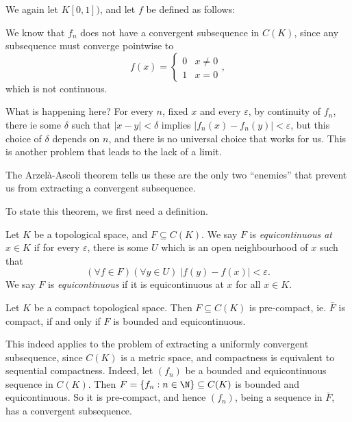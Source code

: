 \documentclass[a4paper]{article}
\begin{document}
\begin{eg}
  We again let $K[0, 1])$, and let $f$ be defined as follows:
  \begin{center}
  \end{center}
  We know that $f_n$ does not have a convergent subsequence in $C(K)$, since any subsequence must converge pointwise to
  \[
    f(x) =
    \begin{cases}
      0 & x \not= 0\\
      1 & x = 0
    \end{cases},
  \]
  which is not continuous.
\end{eg}
What is happening here? For every $n$, fixed $x$ and every $\varepsilon$, by continuity of $f_n$, there ie some $\delta$ such that $|x - y| < \delta$ implies $|f_n(x) - f_n(y)| < \varepsilon$, but this choice of $\delta$ depends on $n$, and there is no universal choice that works for us. This is another problem that leads to the lack of a limit.

The Arzel\`a-Ascoli theorem tells us these are the only two ``enemies'' that prevent us from extracting a convergent subsequence.

To state this theorem, we first need a definition.
\begin{defi}[Equicontinuous]
  Let $K$ be a topological space, and $F\subseteq C(K)$. We say $F$ is \emph{equicontinuous at $x \in K$} if for every $\varepsilon$, there is some $U$ which is an open neighbourhood of $x$ such that
  \[
    (\forall f \in F)(\forall y \in U)\; |f(y) - f(x)| < \varepsilon.
  \]
  We say $F$ is \emph{equicontinuous} if it is equicontinuous at $x$ for all $x \in K$.
\end{defi}

\begin{thm}
  Let $K$ be a compact topological space. Then $F\subseteq C(K)$ is pre-compact, ie. $\bar{F}$ is compact, if and only if $F$ is bounded and equicontinuous.
\end{thm}
This indeed applies to the problem of extracting a uniformly convergent subsequence, since $C(K)$ is a metric space, and compactness is equivalent to sequential compactness. Indeed, let $(f_n)$ be a bounded and equicontinuous sequence in $C(K)$. Then $F = \{f_n: n \in \N\} \subseteq C(K)$ is bounded and equicontinuous. So it is pre-compact, and hence $(f_n)$, being a sequence in $\bar{F}$, has a convergent subsequence.
\end{document}
